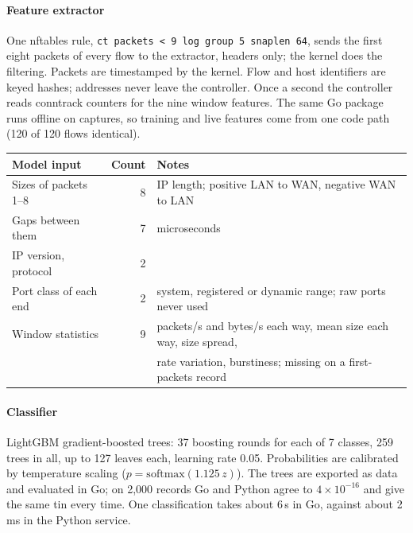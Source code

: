 \documentclass[11pt,a4paper]{article}
\begin{document}
\paragraph{Feature extractor} One nftables rule, \texttt{ct packets < 9 log group 5 snaplen 64}, sends the first eight packets of every flow to the extractor, headers only; the kernel does the filtering. Packets are timestamped by the kernel. Flow and host identifiers are keyed hashes; addresses never leave the controller. Once a second the controller reads conntrack counters for the nine window features. The same Go package runs offline on captures, so training and live features come from one code path (120 of 120 flows identical).

\begin{table}[H]\centering\small
\begin{tabular}{@{}lrl@{}}
\toprule
Model input & Count & Notes \\
\midrule
Sizes of packets 1--8 & 8 & IP length; positive LAN to WAN, negative WAN to LAN \\
Gaps between them & 7 & microseconds \\
IP version, protocol & 2 & \\
Port class of each end & 2 & system, registered or dynamic range; raw ports never used \\
Window statistics & 9 & packets/s and bytes/s each way, mean size each way, size spread, \\
 & & rate variation, burstiness; missing on a first-packets record \\
\bottomrule
\end{tabular}
\end{table}

\paragraph{Classifier} LightGBM gradient-boosted trees: 37 boosting rounds for each of 7 classes, 259 trees in all, up to 127 leaves each, learning rate 0.05. Probabilities are calibrated by temperature scaling ($p = \mathrm{softmax}(1.125\,z)$). The trees are exported as data and evaluated in Go; on 2,000 records Go and Python agree to $4\times10^{-16}$ and give the same tin every time. One classification takes about 6\,\textmu s in Go, against about 2\,ms in the Python service.
\end{document}

